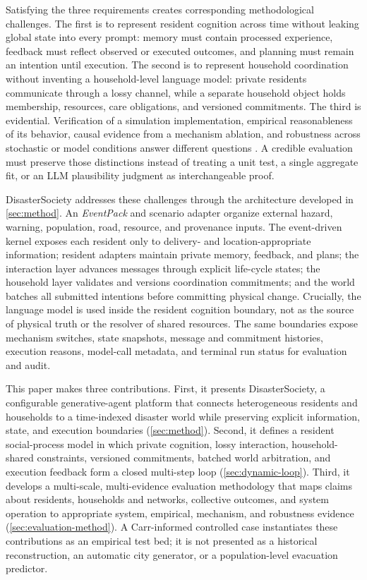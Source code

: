 \documentclass[journal]{IEEEtran}
\begin{document}
Satisfying the three requirements creates corresponding methodological
challenges. The first is to represent resident cognition across time without
leaking global state into every prompt: memory must contain processed
experience, feedback must reflect observed or executed outcomes, and planning
must remain an intention until execution. The second is to represent household
coordination without inventing a household-level language model: private
residents communicate through a lossy channel, while a separate household object
holds membership, resources, care obligations, and versioned commitments. The
third is evidential. Verification of a simulation implementation, empirical
reasonableness of its behavior, causal evidence from a mechanism ablation, and
robustness across stochastic or model conditions answer different questions
\cite{sargent2013verification,klugl2008validation,grimm2005pattern}. A credible
evaluation must preserve those distinctions instead of treating a unit test, a
single aggregate fit, or an LLM plausibility judgment as interchangeable proof.

DisasterSociety addresses these challenges through the architecture developed in
\cref{sec:method}. An \emph{EventPack} and scenario adapter organize external
hazard, warning, population, road, resource, and provenance inputs. The
event-driven kernel exposes each resident only to delivery- and
location-appropriate information; resident adapters maintain private memory,
feedback, and plans; the interaction layer advances messages through explicit
life-cycle states; the household layer validates and versions coordination
commitments; and the world batches all submitted intentions before committing
physical change. Crucially, the language model is used inside the resident
cognition boundary, not as the source of physical truth or the resolver of shared
resources. The same boundaries expose mechanism switches, state snapshots,
message and commitment histories, execution reasons, model-call metadata, and
terminal run status for evaluation and audit.

This paper makes three contributions. First, it presents DisasterSociety, a
configurable generative-agent platform that connects heterogeneous residents and
households to a time-indexed disaster world while preserving explicit
information, state, and execution boundaries (\cref{sec:method}). Second, it
defines a resident social-process model in which private cognition, lossy
interaction, household-shared constraints, versioned commitments, batched world
arbitration, and execution feedback form a closed multi-step loop
(\cref{sec:dynamic-loop}). Third, it develops a multi-scale, multi-evidence
evaluation methodology that maps claims about residents, households and
networks, collective outcomes, and system operation to appropriate system,
empirical, mechanism, and robustness evidence (\cref{sec:evaluation-method}). A
Carr-informed controlled case instantiates these contributions as an empirical
test bed; it is not presented as a historical reconstruction, an automatic city
generator, or a population-level evacuation predictor.
\end{document}
